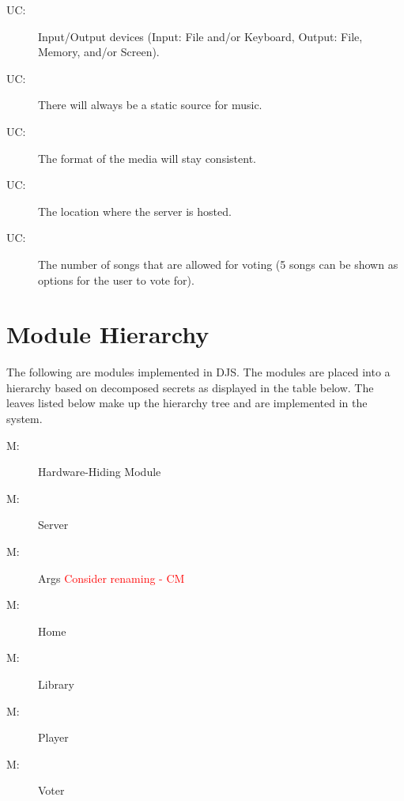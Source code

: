 \documentclass[12pt, titlepage]{article}
\newcounter{ucnum}
\newcommand{\uctheucnum}{UC\theucnum}
\newcounter{mnum}
\newcommand{\mthemnum}{M\themnum}
\begin{document}
\begin{description}
\item[ \uctheucnum \label{ucIO}:] Input/Output devices
 (Input: File and/or Keyboard, Output: File, Memory, and/or Screen).
\item[ \uctheucnum \label{ucInput}:] There will always be a static source for music.
\item[ \uctheucnum \label{ucInput}:] The format of the media will stay consistent.
\item[ \uctheucnum \label{ucInput}:] The location where the server is hosted.
\item[ \uctheucnum \label{ucInput}:] The number of songs that are allowed for voting (5 songs can be shown as options for the user to vote for).
\end{description}


\section{Module Hierarchy} \label{SecMH}
The following are modules implemented in DJS. The modules are placed into a hierarchy based on decomposed secrets as displayed in the table below. The leaves listed below make up the hierarchy tree and are implemented in the system.


\begin{description}
\item [ \mthemnum \label{mHH}:] Hardware-Hiding Module
\item [ \mthemnum \label{mSR}:] Server
\item [ \mthemnum \label{mAS}:] Args \textcolor{red}{Consider renaming - CM}
\item [ \mthemnum \label{mDO}:] Home
\item [ \mthemnum \label{mLM}:] Library
\item [ \mthemnum \label{mPM}:] Player
\item [ \mthemnum \label{mIV}:] Voter

\end{description}
\end{document}
